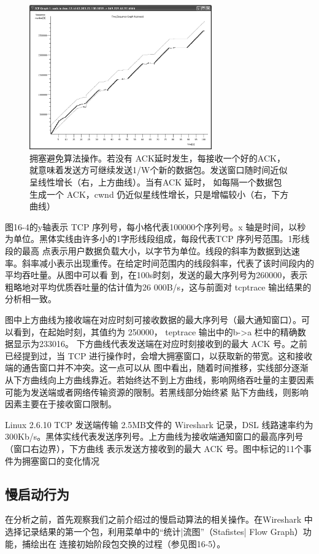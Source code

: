 \begin{figure}[!htb]
    \centering
	\includegraphics[width=0.7\textwidth]{imgs/16/16-4.png}
	\caption{拥塞避免算法操作。若没有 ACK延时发生，每接收一个好的ACK，就意味着发送方可继续发送1/W个新的数据包。发送窗口随时间近似呈线性增长（右，上方曲线）。当有ACK 延时，
    如每隔一个数据包生成一个 ACK，cwnd 仍近似星线性增长，只是增幅较小（右，下方曲线）}
\end{figure}

图16-4的y轴表示 TCP 序列号，每小格代表100000个序列号。x 轴是时间，以秒为单位。黑体实线由许多小的1字形线段组成，每段代表TCP 序列号范围。1形线段的最高
点表示用户数据负载大小，以字节为单位。线段的斜率为数据到达速率。斜率减小表示出现重传。在给定时间范围内的线段斜率，代表了该时间段内的平均吞吐量。从图中可以看
到，在100s时刻，发送的最大序列号为260000，表示粗略地对平均优质吞吐量的估计值为26 000B/s，这与前面对 tcptrace 输出结果的分析相一致。

图中上方曲线为接收端在对应时刻可接收数据的最大序列号（最大通知窗口）。可以看到，在起始时刻，其值约为 250000， teptrace 输出中的b->a 栏中的精确数据显示为233016。
下方曲线代表发送端在对应时刻接收到的最大 ACK 号。之前已经提到过，当 TCP 进行操作时，会增大拥塞窗口，以获取新的带宽。这和接收端的通告窗口并不冲突。这一点可以从
图中看出，随着时间推移，实线部分逐渐从下方曲线向上方曲线靠近。若始终达不到上方曲线，影响网络吞吐量的主要因素可能为发送端或者网络传输资源的限制。若黑线部分始终紧
贴下方曲线，则影响因素主要在于接收窗口限制。

Linux 2.6.10 TCP 发送端传输 2.5MB文件的 Wireshark 记录，DSL 线路速率约为300Kb/s。黑体实线代表发送序列号。上方曲线为接收端通知窗口的最高序列号（窗口右边界），下方曲线
表示发送方接收到的最大 ACK 号。图中标记的11个事件为拥塞窗口的变化情况

\subsection{慢启动行为}
在分析之前，首先观察我们之前介绍过的慢启动算法的相关操作。在Wireshark 中选择记录结果的第一个包，利用菜单中的“统计|流图”（Stafistes| Flow Graph）功能，捕绘出在
连接初始阶段包交换的过程（参见图16-5）。

